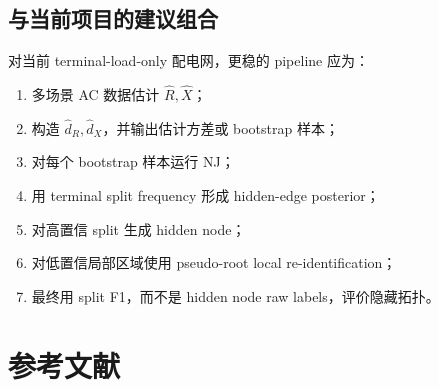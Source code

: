 \documentclass[UTF8,11pt]{ctexart}
\begin{document}
\subsection{与当前项目的建议组合}

对当前 terminal-load-only 配电网，更稳的 pipeline 应为：
\begin{enumerate}[leftmargin=2em]
  \item 多场景 AC 数据估计 $\hat R,\hat X$；
  \item 构造 $\hat d_R,\hat d_X$，并输出估计方差或 bootstrap 样本；
  \item 对每个 bootstrap 样本运行 NJ；
  \item 用 terminal split frequency 形成 hidden-edge posterior；
  \item 对高置信 split 生成 hidden node；
  \item 对低置信局部区域使用 pseudo-root local re-identification；
  \item 最终用 split F1，而不是 hidden node raw labels，评价隐藏拓扑。
\end{enumerate}

\section{参考文献}
\end{document}
